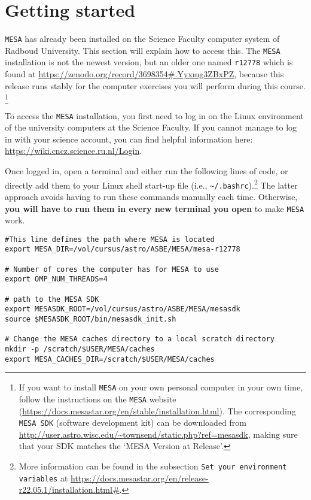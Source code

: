 \documentclass[11pt,a4paper]{article}
\begin{document}

\section{Getting started}

\texttt{MESA} has already been installed on the Science Faculty computer system of Radboud University. This section will explain how to access this. The \texttt{MESA} installation is not the newest version, but an older one named \texttt{r12778} which is found at \url{https://zenodo.org/record/3698354#.Yyxmg3ZBxPZ}, because this release runs stably for the computer exercises you will perform during this course.
\footnote{If you want to install \texttt{MESA} on your own personal computer in your own time, follow the instructions on the \texttt{MESA} website (\url{https://docs.mesastar.org/en/stable/installation.html}). The corresponding \texttt{MESA SDK} (software development kit) can be downloaded from \url{http://user.astro.wisc.edu/~townsend/static.php?ref=mesasdk}, making sure that your SDK matches the `MESA Version at Release'. }

\bigskip\noindent
To access the \texttt{MESA} installation, you first need to log in on the Linux environment of the university computers at the Science Faculty. If you cannot manage to log in with your science account, you can find helpful information here: \url{https://wiki.cncz.science.ru.nl/Login}. 

\bigskip\noindent

Once logged in, open a terminal and either run the following lines of code, or directly add them to your Linux shell start-up file (i.e., \verb|~/.bashrc|).\footnote{More information can be found in the subsection \texttt{Set your environment variables} at \url{https://docs.mesastar.org/en/release-r22.05.1/installation.html\#}.}
%
The latter approach avoids having to run these commands manually each time. Otherwise, \textbf{you will have to run them in every new terminal you open} to make \texttt{MESA} work.

\begin{lstlisting}
#This line defines the path where MESA is located 
export MESA_DIR=/vol/cursus/astro/ASBE/MESA/mesa-r12778

# Number of cores the computer has for MESA to use
export OMP_NUM_THREADS=4

# path to the MESA SDK
export MESASDK_ROOT=/vol/cursus/astro/ASBE/MESA/mesasdk
source $MESASDK_ROOT/bin/mesasdk_init.sh

# Change the MESA caches directory to a local scratch directory
mkdir -p /scratch/$USER/MESA/caches
export MESA_CACHES_DIR=/scratch/$USER/MESA/caches
\end{lstlisting}
\end{document}
